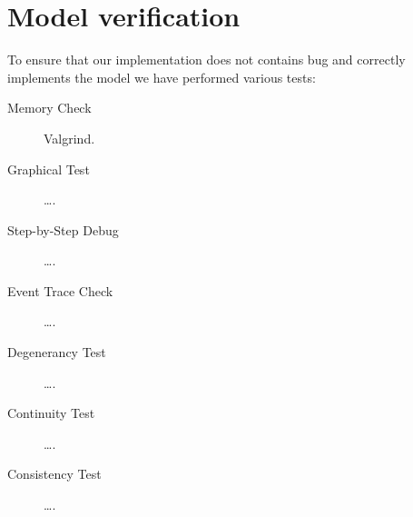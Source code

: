 \section{Model verification}\label{sec:verification}

To ensure that our implementation does not contains bug and correctly implements
the model we have performed various tests:
\begin{description}
	\item[Memory Check] Valgrind.
	\item[Graphical Test] \ldots.
	\item[Step-by-Step Debug] \ldots.
	\item[Event Trace Check] \ldots.
	\item[Degenerancy Test] \ldots.
	\item[Continuity Test] \ldots.
	\item[Consistency Test] \ldots.
\end{description}
